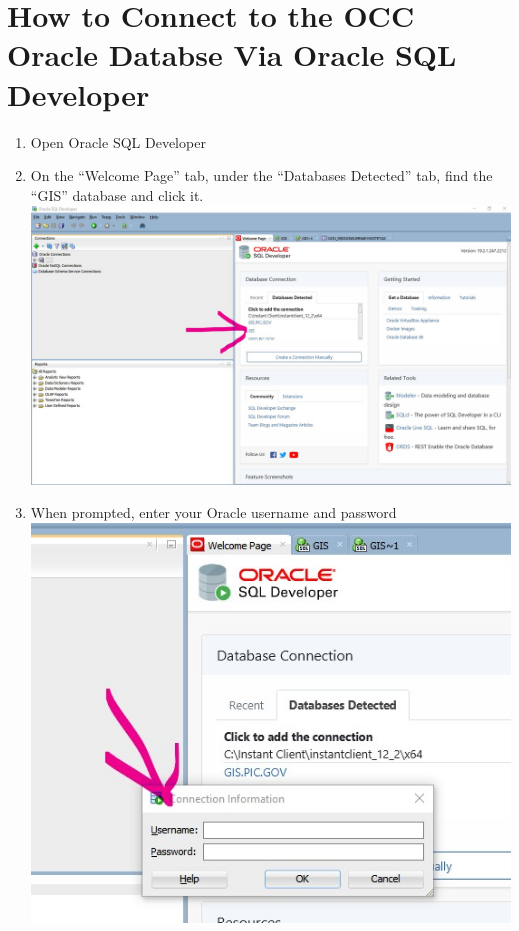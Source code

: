 \documentclass[]{book}
\providecommand{\tightlist}{%
  \setlength{\itemsep}{0pt}\setlength{\parskip}{0pt}}
\begin{document}
\hypertarget{how-to-connect-to-the-occ-oracle-databse-via-oracle-sql-developer}{%
\section{How to Connect to the OCC Oracle Databse Via Oracle SQL Developer}\label{how-to-connect-to-the-occ-oracle-databse-via-oracle-sql-developer}}

\begin{enumerate}
\def\labelenumi{\arabic{enumi}.}
\tightlist
\item
  Open Oracle SQL Developer
\item
  On the ``Welcome Page'' tab, under the ``Databases Detected'' tab, find the ``GIS'' database and click it.
  \includegraphics{images/SQL_Dev_Screenshot_1.jpg}
\item
  When prompted, enter your Oracle username and password
  \includegraphics{images/SQL_Dev_Screenshot_2.jpg}

\end{enumerate}
\end{document}
